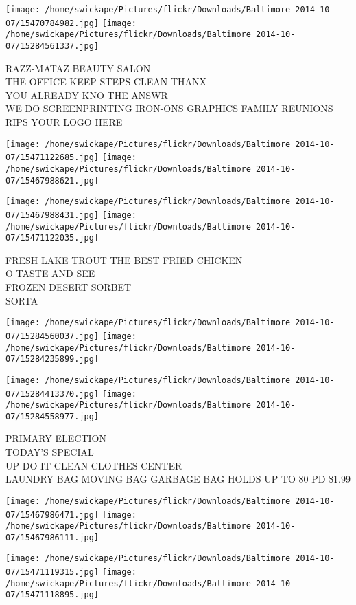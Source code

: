 \documentclass[10pt,letterpaper]{article}
\begin{document}
\texttt{[image: /home/swickape/Pictures/flickr/Downloads/Baltimore 2014-10-07/15470784982.jpg]}
\texttt{[image: /home/swickape/Pictures/flickr/Downloads/Baltimore 2014-10-07/15284561337.jpg]}

RAZZ{-}MATAZ BEAUTY SALON\\
THE OFFICE KEEP STEPS CLEAN THANX\\
YOU ALREADY KNO THE ANSWR\\
WE DO SCREENPRINTING IRON{-}ONS GRAPHICS FAMILY REUNIONS RIPS YOUR LOGO HERE
\pagebreak

\texttt{[image: /home/swickape/Pictures/flickr/Downloads/Baltimore 2014-10-07/15471122685.jpg]}
\texttt{[image: /home/swickape/Pictures/flickr/Downloads/Baltimore 2014-10-07/15467988621.jpg]}

\texttt{[image: /home/swickape/Pictures/flickr/Downloads/Baltimore 2014-10-07/15467988431.jpg]}
\texttt{[image: /home/swickape/Pictures/flickr/Downloads/Baltimore 2014-10-07/15471122035.jpg]}

FRESH LAKE TROUT THE BEST FRIED CHICKEN\\
O TASTE AND SEE\\
FROZEN DESERT SORBET\\
SORTA
\pagebreak

\texttt{[image: /home/swickape/Pictures/flickr/Downloads/Baltimore 2014-10-07/15284560037.jpg]}
\texttt{[image: /home/swickape/Pictures/flickr/Downloads/Baltimore 2014-10-07/15284235899.jpg]}

\texttt{[image: /home/swickape/Pictures/flickr/Downloads/Baltimore 2014-10-07/15284413370.jpg]}
\texttt{[image: /home/swickape/Pictures/flickr/Downloads/Baltimore 2014-10-07/15284558977.jpg]}

PRIMARY ELECTION\\
TODAY'S SPECIAL\\
UP DO IT CLEAN CLOTHES CENTER\\
LAUNDRY BAG MOVING BAG GARBAGE BAG HOLDS UP TO 80 PD \$1.99
\pagebreak

\texttt{[image: /home/swickape/Pictures/flickr/Downloads/Baltimore 2014-10-07/15467986471.jpg]}
\texttt{[image: /home/swickape/Pictures/flickr/Downloads/Baltimore 2014-10-07/15467986111.jpg]}

\texttt{[image: /home/swickape/Pictures/flickr/Downloads/Baltimore 2014-10-07/15471119315.jpg]}
\texttt{[image: /home/swickape/Pictures/flickr/Downloads/Baltimore 2014-10-07/15471118895.jpg]}
\end{document}
